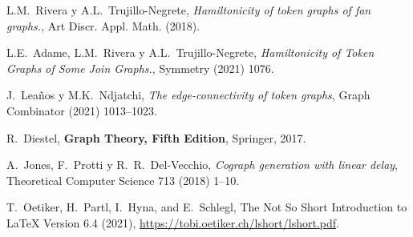 \begin{thebibliography}{99}
  L.M.~Rivera y A.L.~Trujillo-Negrete,
  \textit{Hamiltonicity of token graphs of fan graphs.},
  Art Discr. Appl. Math. (2018). 

  L.E.~Adame, L.M.~Rivera y A.L.~Trujillo-Negrete,
  \textit{Hamiltonicity of Token Graphs of Some Join Graphs.},
  Symmetry (2021) 1076. 

  J.~Lea\~{n}os y M.K.~Ndjatchi,
  \textit{The edge-connectivity of token graphs},
  Graph Combinator (2021) 1013--1023. 
 

  R.~Diestel,
  \textbf{Graph Theory, Fifth Edition},
  Springer, 2017.

  A.~Jones, F.~Protti y R.~R.~Del-Vecchio,
  \textit{Cograph generation with linear delay},
  Theoretical Computer Science 713 (2018) 1--10.

  T.~Oetiker, H.~Partl, I.~Hyna, and E.~Schlegl,
  The Not So Short Introduction to \LaTeX{} Version 6.4 (2021),
  \href{https://tobi.oetiker.ch/lshort/lshort.pdf}{%
  https://tobi.oetiker.ch/lshort/lshort.pdf}.

\end{thebibliography}
